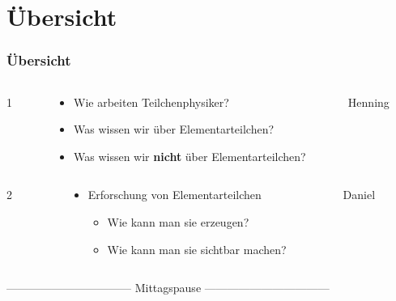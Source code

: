 \documentclass{beamer}
\begin{document}
\section{\"Ubersicht}
\begin{frame}
  \frametitle{\"Ubersicht}
  \begin{columns}
    \begin{column}{0.05\textwidth}
      \centering
      \alert{\Huge 1}
    \end{column}
    \begin{column}{0.68\textwidth}
      \begin{itemize}
      \item Wie arbeiten Teilchenphysiker?
      \item Was wissen wir \"uber Elementarteilchen?
      \item Was wissen wir \textbf{nicht} \"uber Elementarteilchen?
      \end{itemize}
    \end{column}
    \begin{column}{0.27\textwidth}
      \centering
      \alert{Henning}
    \end{column}
  \end{columns}
  \vskip0.5cm
  \begin{columns}
    \begin{column}{0.05\textwidth}
      \centering
      \alert{\Huge 2}
    \end{column}
    \begin{column}{0.68\textwidth}
      \begin{itemize}
      \item Erforschung von Elementarteilchen
        \begin{itemize}
        \item Wie kann man sie erzeugen?
        \item Wie kann man sie sichtbar machen?
        \end{itemize}
      \end{itemize}
    \end{column}
    \begin{column}{0.27\textwidth}
      \centering
      \alert{Daniel}
    \end{column}
  \end{columns}
  \begin{center}
    ---------------------------------   Mittagspause   ---------------------------------
  \end{center}

\end{frame}
\end{document}
